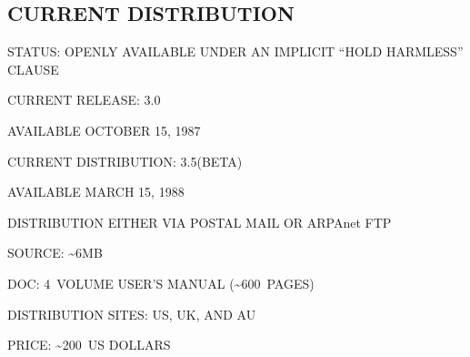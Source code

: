 \begin{bwslide}
\part*	{CURRENT DISTRIBUTION}\bf

\begin{nrtc}
\item	STATUS: OPENLY AVAILABLE UNDER AN IMPLICIT ``HOLD HARMLESS'' CLAUSE

\item	CURRENT RELEASE: 3.0
    \begin{nrtc}
    \item	AVAILABLE OCTOBER 15, 1987
    \end{nrtc}

\item	CURRENT DISTRIBUTION: 3.5(BETA)
    \begin{nrtc}
    \item	AVAILABLE MARCH 15, 1988
    \end{nrtc}

\item	DISTRIBUTION EITHER VIA POSTAL MAIL OR ARPAnet FTP
    \begin{nrtc}
    \item	SOURCE: \~{}6MB

    \item	DOC: 4~VOLUME USER'S MANUAL (\~{}600~PAGES)

    \item	DISTRIBUTION SITES: US, UK, AND AU

    \item	PRICE: \~{}200~US DOLLARS
    \end{nrtc}
\end{nrtc}
\end{bwslide}


